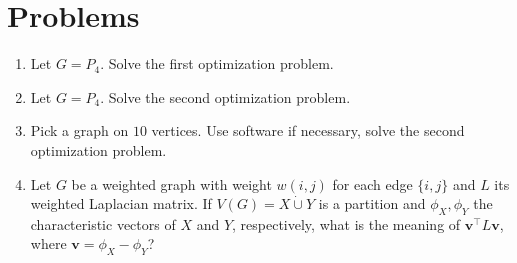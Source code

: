 \documentclass{article}
\newcommand{\trans}{^\top}
\newcommand{\dunion}{\mathbin{\dot\cup}}
\newcommand{\bv}{\mathbf{v}}
\theoremstyle{definition}
\begin{document}
\section*{Problems}
\begin{enumerate}
\setlength\itemsep{2em}
\item Let $G = P_{4}$.  Solve the first optimization problem.  
\item Let $G = P_{4}$.  Solve the second optimization problem.
\item Pick a graph on $10$ vertices.  Use software if necessary, solve the second optimization problem.
\item Let $G$ be a weighted graph with weight $w(i,j)$ for each edge $\{i,j\}$ and $L$ its weighted Laplacian matrix.  If $V(G) = X\dunion Y$ is a partition and $\phi_X,\phi_Y$ the characteristic vectors of $X$ and $Y$, respectively, what is the meaning of $\bv\trans L\bv$, where $\bv = \phi_X - \phi_Y$?
\end{enumerate}

\end{document}
